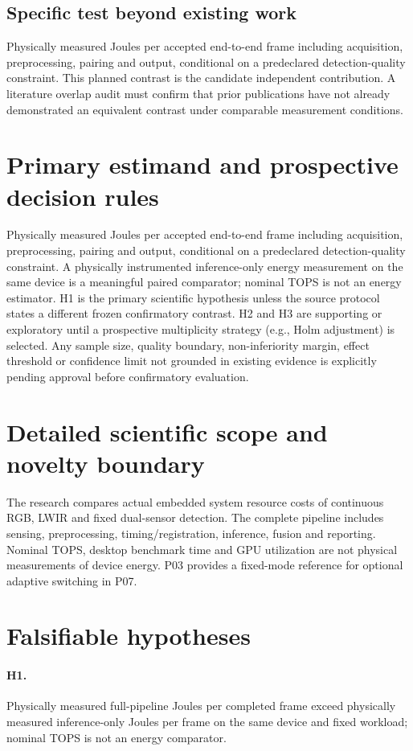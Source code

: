 \documentclass[11pt,a4paper]{article}
\begin{document}
\subsection{Specific test beyond existing work}
Physically measured Joules per accepted end-to-end frame including acquisition, preprocessing, pairing and output, conditional on a predeclared detection-quality constraint. This planned contrast is the candidate independent contribution. A literature overlap audit must confirm that prior publications have not already demonstrated an equivalent contrast under comparable measurement conditions.

\section{Primary estimand and prospective decision rules}
Physically measured Joules per accepted end-to-end frame including acquisition, preprocessing, pairing and output, conditional on a predeclared detection-quality constraint. A physically instrumented inference-only energy measurement on the same device is a meaningful paired comparator; nominal TOPS is not an energy estimator. H1 is the primary scientific hypothesis unless the source protocol states a different frozen confirmatory contrast. H2 and H3 are supporting or exploratory until a prospective multiplicity strategy (e.g., Holm adjustment) is selected. Any sample size, quality boundary, non-inferiority margin, effect threshold or confidence limit not grounded in existing evidence is explicitly pending approval before confirmatory evaluation.

\section{Detailed scientific scope and novelty boundary}
The research compares actual embedded system resource costs of continuous RGB, LWIR and fixed dual-sensor detection. The complete pipeline includes sensing, preprocessing, timing/registration, inference, fusion and reporting. Nominal TOPS, desktop benchmark time and GPU utilization are not physical measurements of device energy. P03 provides a fixed-mode reference for optional adaptive switching in P07.

\section{Falsifiable hypotheses}
\paragraph{H1.} Physically measured full-pipeline Joules per completed frame exceed physically measured inference-only Joules per frame on the same device and fixed workload; nominal TOPS is not an energy comparator.
\end{document}
